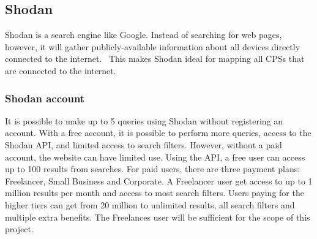 \subsection{Shodan}\label{sec:shodan}
Shodan is a search engine like Google. Instead of searching for web pages, however, it will gather publicly-available information about all devices directly connected to the internet.~\cite{shodan} This makes Shodan ideal for mapping all CPSs that are connected to the internet.

\subsubsection{Shodan account}
It is possible to make up to 5 queries using Shodan without registering an account. 
With a free account, it is possible to perform more queries, access to the Shodan API, and limited access to search filters. However, without a paid account, the website can have limited use.
Using the API, a free user can access up to 100 results from searches. 
For paid users, there are three payment plans: Freelancer, Small Business and Corporate. A Freelancer user get access to up to 1 million results per month and access to most search filters. 
Users paying for the higher tiers can get from 20 million to unlimited results, all search filters and multiple extra benefits. 
The Freelances user will be sufficient for the scope of this project.

